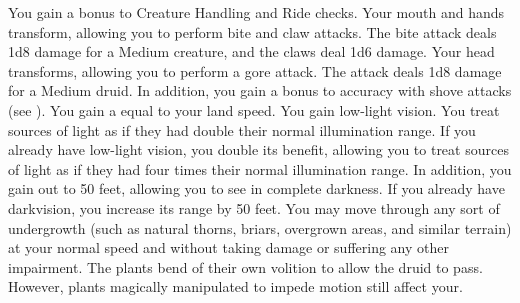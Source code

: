         You gain a  bonus to Creature Handling and Ride checks.
        Your mouth and hands transform, allowing you to perform bite and claw attacks.
        The bite attack deals 1d8 damage for a Medium creature, and the claws deal 1d6 damage.
        Your head transforms, allowing you to perform a gore attack.
        The attack deals 1d8 damage for a Medium druid.
        In addition, you gain a  bonus to accuracy with shove attacks (see ).
        You gain a  equal to your land speed.
        You gain low-light vision.
        You treat sources of light as if they had double their normal illumination range.
        If you already have low-light vision, you double its benefit, allowing you to treat sources of light as if they had four times their normal illumination range.
        In addition, you gain  out to 50 feet, allowing you to see in complete darkness.
        If you already have darkvision, you increase its range by 50 feet.
        You may move through any sort of undergrowth (such as natural thorns, briars, overgrown areas, and similar terrain) at your normal speed and without taking damage or suffering any other impairment.
        The plants bend of their own volition to allow the druid to pass.
        However, plants magically manipulated to impede motion still affect your.

